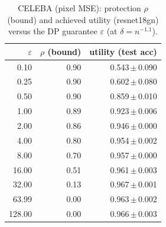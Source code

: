 \begin{table}[t]
  \centering
  \caption{CELEBA (pixel MSE): protection $\rho$ (bound) and achieved utility (resnet18gn) versus the DP guarantee $\varepsilon$ (at $\delta=n^{-1.1}$).}
  \label{tab:util_celeba_mse}
  \begin{tabular}{r r r}
    \toprule
    $\varepsilon$ & $\rho$ (bound) & utility (test acc) \\
    \midrule
    0.10 & 0.90 & 0.543\,$\pm$\,0.090 \\
    0.25 & 0.90 & 0.602\,$\pm$\,0.080 \\
    0.50 & 0.90 & 0.859\,$\pm$\,0.010 \\
    1.00 & 0.89 & 0.923\,$\pm$\,0.006 \\
    2.00 & 0.86 & 0.946\,$\pm$\,0.000 \\
    4.00 & 0.80 & 0.954\,$\pm$\,0.002 \\
    8.00 & 0.70 & 0.957\,$\pm$\,0.000 \\
    16.00 & 0.51 & 0.961\,$\pm$\,0.003 \\
    32.00 & 0.13 & 0.967\,$\pm$\,0.001 \\
    63.99 & 0.00 & 0.963\,$\pm$\,0.002 \\
    128.00 & 0.00 & 0.966\,$\pm$\,0.003 \\
    \bottomrule
  \end{tabular}
\end{table}
